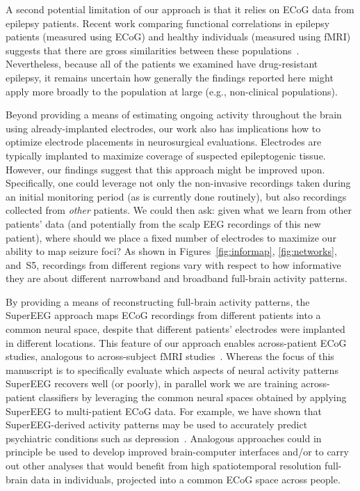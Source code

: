 \documentclass[11pt]{article}
\newcommand{\networkpower}{S5}
\begin{document}
A second potential limitation of our approach is that it relies on
ECoG data from epilepsy patients.  Recent work comparing functional
correlations in epilepsy patients (measured using ECoG) and healthy
individuals (measured using fMRI) suggests that there are gross
similarities between these populations~\citep[e.g.,][]{ReddEtal18,
  KucyEtal18}.  Nevertheless, because all of the patients we examined
have drug-resistant epilepsy, it remains uncertain how generally the
findings reported here might apply more broadly to the population at
large (e.g., non-clinical populations).

Beyond providing a means of estimating ongoing activity throughout the brain
using already-implanted electrodes, our work also has implications how to
optimize electrode placements in neurosurgical evaluations. Electrodes are
typically implanted to maximize coverage of suspected epileptogenic tissue.
However, our findings suggest that this approach might be improved upon.
Specifically, one could leverage not only the non-invasive recordings taken
during an initial monitoring period (as is currently done routinely), but also
recordings collected from \textit{other} patients.  We could then ask: given
what we learn from other patients' data (and potentially from the scalp EEG
recordings of this new patient), where should we place a fixed number of
electrodes to maximize our ability to map seizure foci?  As shown in
Figures~\ref{fig:informap}, \ref{fig:networks}, and~\networkpower, recordings
from different regions vary with respect to how informative they are about
different narrowband and broadband full-brain activity patterns.

By providing a means of reconstructing full-brain activity patterns, the
SuperEEG approach maps ECoG recordings from different patients into a common
neural space, despite that different patients' electrodes were implanted in
different locations. This feature of our approach enables across-patient ECoG
studies, analogous to across-subject fMRI studies~\citep[e.g.,][]{HaxbEtal01,
NormEtal06, HaxbEtal11}. Whereas the focus of this manuscript is to specifically
evaluate which aspects of neural activity patterns SuperEEG recovers well (or
poorly), in parallel work we are training across-patient classifiers by
leveraging the common neural spaces obtained by applying SuperEEG to
multi-patient ECoG data.  For example, we have shown that SuperEEG-derived
activity patterns may be used to accurately predict psychiatric conditions such
as depression~\citep{ScanEtal20}.  Analogous approaches could in principle be
used to develop improved brain-computer interfaces and/or to carry out other
analyses that would benefit from high spatiotemporal resolution full-brain data
in individuals, projected into a common ECoG space across people.
\end{document}

